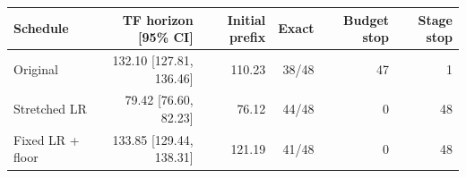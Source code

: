 \begin{tabular}{lrrrrr}
\toprule
Schedule & TF horizon [95\% CI] & Initial prefix & Exact & Budget stop & Stage stop \\
\midrule
Original & 132.10 [127.81, 136.46] & 110.23 & 38/48 & 47 & 1 \\
Stretched LR & 79.42 [76.60, 82.23] & 76.12 & 44/48 & 0 & 48 \\
Fixed LR + floor & 133.85 [129.44, 138.31] & 121.19 & 41/48 & 0 & 48 \\
\bottomrule
\end{tabular}
